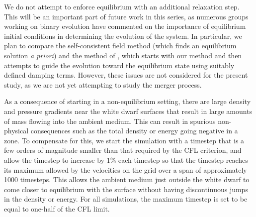 \documentclass{emulateapj}
\begin{document}
We do not attempt to enforce equilibrium with an additional relaxation
step. This will be an important part of future work in this series, as
numerous groups working on binary evolution
\citep{swc:2000,motl:2002,rosswog:2004,dan:2011,pakmor:2012:gadget}
have commented on the importance of equilibrium initial conditions in
determining the evolution of the system. In particular, we plan to
compare the self-consistent field method (which finds an equilibrium
solution \textit{a priori}) and the method of \cite{rosswog:2004},
which starts with our method and then attempts to guide the evolution
toward the equilibrium state using suitably defined damping
terms. However, these issues are not considered for the present study,
as we are not yet attempting to study the merger process.

As a consequence of starting in a non-equilibrium setting, there are 
large density and pressure gradients near the white dwarf surfaces
that result in large amounts of mass flowing into the ambient
medium. This can result in spurious non-physical consequences such as 
the total density or energy going negative in a zone. To compensate 
for this, we start the simulation with a timestep that is a few orders 
of magnitude smaller than that required by the CFL criterion, and allow
the timestep to increase by 1\% each timestep so that the timestep reaches 
its maximum allowed by the velocities on the grid over a span of approximately 
1000 timesteps. This allows the ambient medium just outside the white dwarf
to come closer to equilibrium with the surface without having 
discontinuous jumps in the density or energy. For all simulations, 
the maximum timestep is set to be equal to one-half of the CFL limit.
\end{document}
